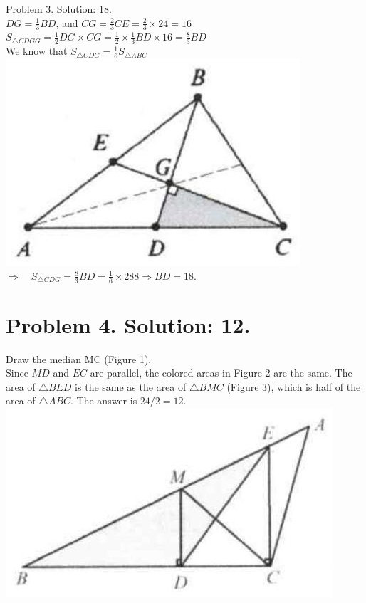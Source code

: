 \documentclass[10pt]{article}
\begin{document}
Problem 3. Solution: 18.\\
\(D G=\frac{1}{3} B D\), and \(C G=\frac{2}{3} C E=\frac{2}{3} \times 24=16\)\\
\(S_{\triangle C D G G}=\frac{1}{2} D G \times C G=\frac{1}{2} \times \frac{1}{3} B D \times 16=\frac{8}{3} B D\)\\
We know that \(S_{\triangle C D G}=\frac{1}{6} S_{\triangle A B C}\)\\
\includegraphics[max width=\textwidth, center]{2025_04_17_97bc1f7e44d93c271a88g-018(3)}\\
\(\Rightarrow \quad S_{\triangle C D G}=\frac{8}{3} B D=\frac{1}{6} \times 288 \Rightarrow B D=18\).

\section*{Problem 4. Solution: 12.}
Draw the median MC (Figure 1).\\
Since \(M D\) and \(E C\) are parallel, the colored areas in Figure 2 are the same. The area of \(\triangle B E D\) is the same as the area of \(\triangle B M C\) (Figure 3), which is half of the area of \(\triangle A B C\). The answer is \(24 / 2=12\).\\
\includegraphics[max width=\textwidth, center]{2025_04_17_97bc1f7e44d93c271a88g-018(2)}
\end{document}
